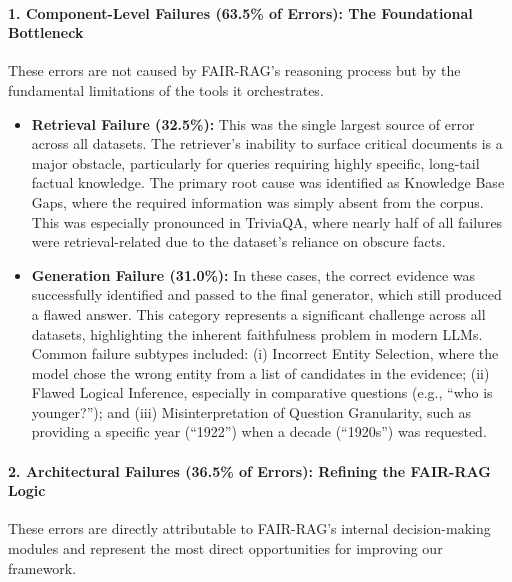 \documentclass[11pt]{article}
\begin{document}
\paragraph{1. Component-Level Failures (63.5\% of Errors): The Foundational Bottleneck}

These errors are not caused by FAIR-RAG's reasoning process but by the fundamental limitations of the tools it orchestrates.

\begin{itemize}
    \item \textbf{Retrieval Failure (32.5\%):} This was the single largest source of error across all datasets. The retriever's inability to surface critical documents is a major obstacle, particularly for queries requiring highly specific, long-tail factual knowledge. The primary root cause was identified as Knowledge Base Gaps, where the required information was simply absent from the corpus. This was especially pronounced in TriviaQA, where nearly half of all failures were retrieval-related due to the dataset's reliance on obscure facts.
    
    \item \textbf{Generation Failure (31.0\%):} In these cases, the correct evidence was successfully identified and passed to the final generator, which still produced a flawed answer. This category represents a significant challenge across all datasets, highlighting the inherent faithfulness problem in modern LLMs. Common failure subtypes included: (i) Incorrect Entity Selection, where the model chose the wrong entity from a list of candidates in the evidence; (ii) Flawed Logical Inference, especially in comparative questions (e.g., ``who is younger?''); and (iii) Misinterpretation of Question Granularity, such as providing a specific year (``1922'') when a decade (``1920s'') was requested.
\end{itemize}

\paragraph{2. Architectural Failures (36.5\% of Errors): Refining the FAIR-RAG Logic}

These errors are directly attributable to FAIR-RAG's internal decision-making modules and represent the most direct opportunities for improving our framework.
\end{document}
